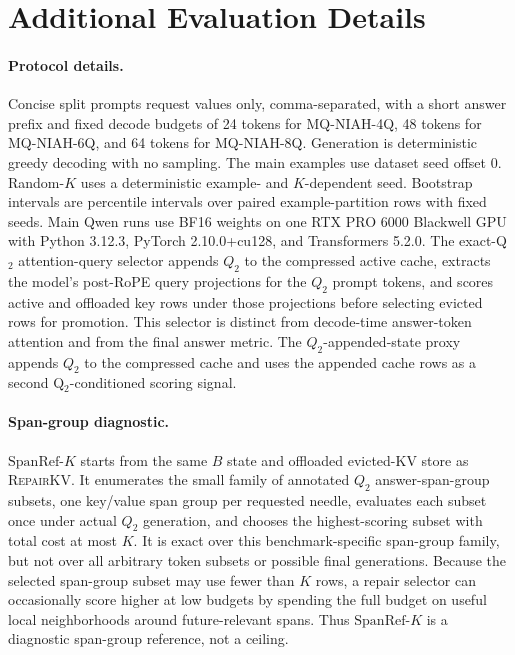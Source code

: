 \documentclass{article}
\newcommand{\repairkv}{\textsc{RepairKV}}
\newcommand{\spanref}{\ensuremath{\mathrm{SpanRef}\mbox{-}K}}
\begin{document}
\newpage
\appendix
\raggedbottom

\section{Additional Evaluation Details}
\label{app:evaluation-details}

\paragraph{Protocol details.}
Concise split prompts request values only, comma-separated, with a short
answer prefix and fixed decode budgets of 24 tokens for MQ-NIAH-4Q,
48 tokens for MQ-NIAH-6Q, and 64 tokens for MQ-NIAH-8Q.
Generation is deterministic greedy decoding with no sampling.
The main examples use dataset seed offset 0.
Random-$K$ uses a
deterministic example- and $K$-dependent seed.
Bootstrap intervals are percentile intervals over paired
example-partition rows with fixed seeds.
Main Qwen runs use BF16 weights on one RTX PRO 6000 Blackwell GPU with
Python 3.12.3, PyTorch 2.10.0+cu128, and Transformers 5.2.0.
The exact-Q$_2$ attention-query selector appends $Q_2$ to
the compressed active cache, extracts the model's post-RoPE query
projections for the $Q_2$ prompt tokens, and scores active and offloaded
key rows under those projections before selecting evicted rows for
promotion. This selector is distinct from decode-time answer-token
attention and from the final answer metric. The $Q_2$-appended-state proxy
appends $Q_2$ to the compressed cache and uses the appended cache rows as
a second Q$_2$-conditioned scoring signal.

\paragraph{Span-group diagnostic.}
\spanref{} starts from the same $B$ state and offloaded evicted-KV store
as \repairkv{}.
It enumerates the small family of annotated $Q_2$ answer-span-group
subsets, one key/value span group per requested needle, evaluates each
subset once under actual $Q_2$ generation, and chooses the
highest-scoring subset with total cost at most $K$.
It is exact over this benchmark-specific span-group family, but not over
all arbitrary token subsets or possible final generations.
Because the selected span-group subset may use fewer than $K$ rows, a
repair selector can occasionally score higher at low budgets by spending
the full budget on useful local neighborhoods around future-relevant
spans. Thus \spanref{} is a diagnostic span-group reference, not a
ceiling. 
\end{document}
